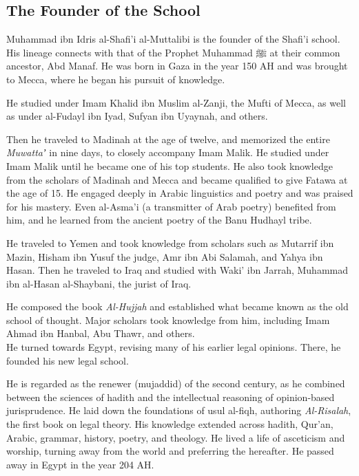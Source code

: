 \documentclass[
  a4paper,
  DIV=11,
  numbers=noendperiod]{scrartcl}
\begin{document}
\subsection{The Founder of the School}\label{the-founder-of-the-school}

Muhammad ibn Idris al-Shafi'i al-Muttalibi is the founder of the Shafi'i
school. His lineage connects with that of the Prophet Muhammad ﷺ at
their common ancestor, Abd Manaf. He was born in Gaza in the year 150 AH
and was brought to Mecca, where he began his pursuit of knowledge.

He studied under Imam Khalid ibn Muslim al-Zanji, the Mufti of Mecca, as
well as under al-Fudayl ibn Iyad, Sufyan ibn Uyaynah, and others.

Then he traveled to Madinah at the age of twelve, and memorized the
entire \emph{Muwattaʼ} in nine days, to closely accompany Imam Malik. He
studied under Imam Malik until he became one of his top students. He
also took knowledge from the scholars of Madinah and Mecca and became
qualified to give Fatawa at the age of 15. He engaged deeply in Arabic
linguistics and poetry and was praised for his mastery. Even al-Asma'i
(a transmitter of Arab poetry) benefited from him, and he learned from
the ancient poetry of the Banu Hudhayl tribe.

He traveled to Yemen and took knowledge from scholars such as Mutarrif
ibn Mazin, Hisham ibn Yusuf the judge, Amr ibn Abi Salamah, and Yahya
ibn Hasan. Then he traveled to Iraq and studied with Waki' ibn Jarrah,
Muhammad ibn al-Hasan al-Shaybani, the jurist of Iraq.

He composed the book \emph{Al-Hujjah} and established what became known
as the old school of thought. Major scholars took knowledge from him,
including Imam Ahmad ibn Hanbal, Abu Thawr, and others.\\
He turned towards Egypt, revising many of his earlier legal opinions.
There, he founded his new legal school.

He is regarded as the renewer (mujaddid) of the second century, as he
combined between the sciences of hadith and the intellectual reasoning
of opinion-based jurisprudence. He laid down the foundations of usul
al-fiqh, authoring \emph{Al-Risalah}, the first book on legal theory.
His knowledge extended across hadith, Qur'an, Arabic, grammar, history,
poetry, and theology. He lived a life of asceticism and worship, turning
away from the world and preferring the hereafter. He passed away in
Egypt in the year 204 AH.
\end{document}
